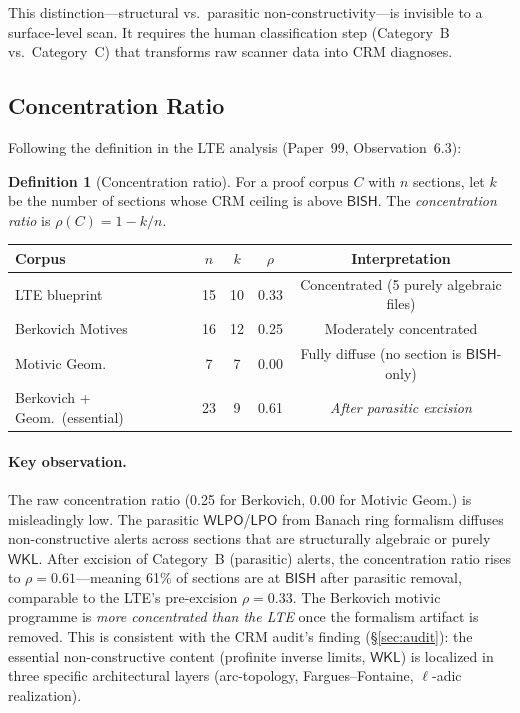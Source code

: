\documentclass[11pt,a4paper]{article}
\theoremstyle{plain}
\theoremstyle{definition}
\newtheorem{definition}[theorem]{Definition}
\newcommand{\BISH}{\textsf{BISH}}
\newcommand{\WKL}{\textsf{WKL}}
\newcommand{\WLPO}{\textsf{WLPO}}
\newcommand{\LPO}{\textsf{LPO}}
\begin{document}
This distinction---structural vs.\ parasitic non-constructivity---is invisible to a surface-level scan.  It requires the human classification step (Category~B vs.\ Category~C) that transforms raw scanner data into CRM diagnoses.


\subsection{Concentration Ratio}

Following the definition in the LTE analysis (Paper~99, Observation~6.3):

\begin{definition}[Concentration ratio]
For a proof corpus $C$ with $n$ sections, let $k$ be the number of sections whose CRM ceiling is above $\BISH$.  The \emph{concentration ratio} is $\rho(C) = 1 - k/n$.
\end{definition}

\begin{center}
\begin{tabular}{lcccc}
\toprule
\textbf{Corpus} & \textbf{$n$} & \textbf{$k$} & \textbf{$\rho$} & \textbf{Interpretation} \\
\midrule
LTE blueprint        & 15 & 10 & 0.33 & Concentrated (5 purely algebraic files) \\
Berkovich Motives     & 16 & 12 & 0.25 & Moderately concentrated \\
Motivic Geom.         &  7 &  7 & 0.00 & Fully diffuse (no section is $\BISH$-only) \\
Berkovich + Geom.\ (essential) & 23 &  9 & 0.61 & \emph{After parasitic excision} \\
\bottomrule
\end{tabular}
\end{center}

\paragraph{Key observation.}
The raw concentration ratio (0.25 for Berkovich, 0.00 for Motivic Geom.) is misleadingly low.  The parasitic $\WLPO$/$\LPO$ from Banach ring formalism diffuses non-constructive alerts across sections that are structurally algebraic or purely $\WKL$.  After excision of Category~B (parasitic) alerts, the concentration ratio rises to $\rho = 0.61$---meaning 61\% of sections are at $\BISH$ after parasitic removal, comparable to the LTE's pre-excision $\rho = 0.33$.  The Berkovich motivic programme is \emph{more concentrated than the LTE} once the formalism artifact is removed.  This is consistent with the CRM audit's finding (\S\ref{sec:audit}): the essential non-constructive content (profinite inverse limits, $\WKL$) is localized in three specific architectural layers (arc-topology, Fargues--Fontaine, $\ell$-adic realization).
\end{document}

